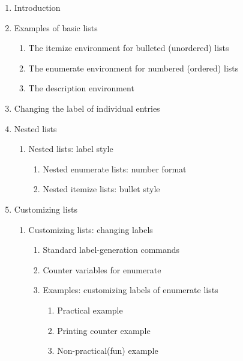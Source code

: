 \documentclass{book}
\begin{document}
\renewcommand{\labelenumi}{\arabic{enumi}}
\renewcommand{\labelenumii}{\arabic{enumi}.\arabic{enumii}}
\renewcommand{\labelenumiii}{\arabic{enumi}.\arabic{enumii}.\arabic{enumiii}}
\renewcommand{\labelenumiv}{\arabic{enumi}.\arabic{enumii}.\arabic{enumiii}.\arabic{enumiv}}

\begin{enumerate}
\item Introduction
\item Examples of basic lists
  \begin{enumerate}
    \item The itemize environment for bulleted (unordered) lists
    \item The enumerate environment for numbered (ordered) lists
    \item The description environment
  \end{enumerate}
\item Changing the label of individual entries
\item Nested lists
      \begin{enumerate}
        \item Nested lists: label style
        \begin{enumerate}
          \item Nested enumerate lists: number format
          \item Nested itemize lists: bullet style
        \end{enumerate}
      \end{enumerate}
\item Customizing lists
   \begin{enumerate}
    \item Customizing lists: changing labels
    \begin{enumerate}
      \item Standard label-generation commands
      \item Counter variables for enumerate
      \item Examples: customizing labels of enumerate lists
            \begin{enumerate}
             \item Practical example
             \item Printing counter example
             \item Non-practical(fun) example             
             

\end{enumerate}
\end{enumerate}
\end{enumerate}
\end{enumerate}
\end{document}
